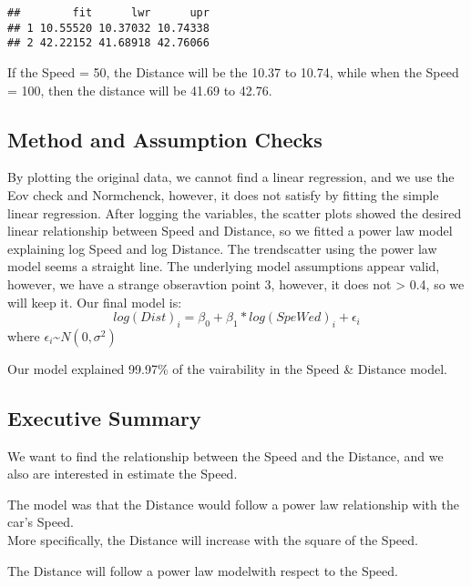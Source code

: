 \documentclass[
]{article}
\begin{document}
\begin{verbatim}
##        fit      lwr      upr
## 1 10.55520 10.37032 10.74338
## 2 42.22152 41.68918 42.76066
\end{verbatim}

If the Speed = 50, the Distance will be the 10.37 to 10.74, while when
the Speed = 100, then the distance will be 41.69 to 42.76.

\hypertarget{method-and-assumption-checks}{%
\subsection{Method and Assumption
Checks}\label{method-and-assumption-checks}}

By plotting the original data, we cannot find a linear regression, and
we use the Eov check and Normchenck, however, it does not satisfy by
fitting the simple linear regression. After logging the variables, the
scatter plots showed the desired linear relationship between Speed and
Distance, so we fitted a power law model explaining log Speed and log
Distance. The trendscatter using the power law model seems a straight
line. The underlying model assumptions appear valid, however, we have a
strange obseravtion point 3, however, it does not \textgreater{} 0.4, so
we will keep it. Our final model is:\\
\[log(Dist)_i = \beta_0 + \beta_1 * log(SpeWed)_i + \epsilon_i \] where
\(\epsilon_i\)\textasciitilde{}\(N(0,\sigma^2)\)

Our model explained 99.97\% of the vairability in the Speed \& Distance
model.

\hypertarget{executive-summary}{%
\subsection{Executive Summary}\label{executive-summary}}

We want to find the relationship between the Speed and the Distance, and
we also are interested in estimate the Speed.

The model was that the Distance would follow a power law relationship
with the car's Speed.\\
More specifically, the Distance will increase with the square of the
Speed.

The Distance will follow a power law modelwith respect to the Speed.
\end{document}
